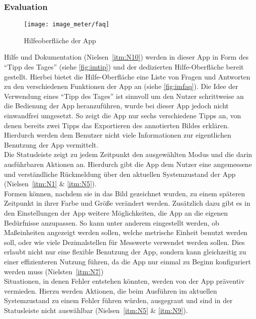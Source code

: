 \subsubsection{Evaluation}\label{subsec:imeva}
\begin{wrapfigure}{R}{0.5\textwidth}
  \centering
  \texttt{[image: image\_meter/faq]}
  \caption{Hilfeoberfläche der App}
  \label{fig:imfaq}
\end{wrapfigure}

Hilfe und Dokumentation (Nielsen~\autoref{itm:N10}) werden in dieser App in Form des ``Tipp des Tages'' (siehe \autoref{fig:imtip}) und der dedizierten Hilfe-Oberfläche bereit gestellt.
Hierbei bietet die Hilfe-Oberfläche eine Liste von Fragen und Antworten zu den verschiedenen Funktionen der App an (siehe \autoref{fig:imfaq}). 
Die Idee der Verwendung eines ``Tipp des Tages'' ist sinnvoll um den Nutzer schrittweise an die Bedienung der App heranzuführen, wurde bei dieser App jedoch nicht einwandfrei umgesetzt.
So zeigt die App nur sechs verschiedene Tipps an, von denen bereits zwei Tipps das Exportieren des annotierten Bildes erklären.
Hierdurch werden dem Benutzer nicht viele Informationen zur eigentlichen Benutzung der App vermittelt. \\

Die Statusleiste zeigt zu jedem Zeitpunkt den ausgewählten Modus und die darin ausführbaren Aktionen an.
Hierdurch gibt die App dem Nutzer eine angemessene und verständliche Rückmeldung über den aktuellen Systemzustand der App (Nielsen~\autoref{itm:N1} \& \autoref{itm:N5}). \\

Formen können, nachdem sie in das Bild gezeichnet wurden, zu einem späteren Zeitpunkt in ihrer Farbe und Größe verändert werden.
Zusätzlich dazu gibt es in den Einstellungen der App weitere Möglichkeiten, die App an die eigenen Bedürfnisse anzupassen.
So kann unter anderem eingestellt werden, ob Maßeinheiten angezeigt werden sollen, welche metrische Einheit benutzt werden soll, oder wie viele Dezimalstellen für Messwerte verwendet werden sollen.
Dies erlaubt nicht nur eine flexible Benutzung der App, sondern kann gleichzeitig zu einer effizienteren Nutzung führen, da die App nur einmal zu Beginn konfiguriert werden muss (Nielsten~\autoref{itm:N7}) \\

Situationen, in denen Fehler entstehen könnten, werden von der App präventiv vermieden.
Hierzu werden Aktionen, die beim Ausführen im aktuellen Systemzustand zu einem Fehler führen würden, ausgegraut und sind in der Statusleiste nicht auswählbar (Nielsen~\autoref{itm:N5} \& \autoref{itm:N9}). \\

